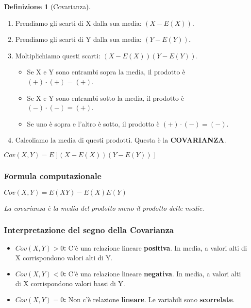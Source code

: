 \documentclass[a4paper, 11pt]{article}
\theoremstyle{definition}
\newtheorem{definizione}{Definizione}[section]
\begin{document}
\begin{definizione}[Covarianza]
\begin{enumerate}
    \item Prendiamo gli scarti di X dalla sua media: $(X - E(X))$.
    \item Prendiamo gli scarti di Y dalla sua media: $(Y - E(Y))$.
    \item Moltiplichiamo questi scarti: $(X - E(X))(Y - E(Y))$.
    \begin{itemize}
        \item Se X e Y sono entrambi sopra la media, il prodotto è $(+) \cdot (+) = (+)$.
        \item Se X e Y sono entrambi sotto la media, il prodotto è $(-) \cdot (-) = (+)$.
        \item Se uno è sopra e l'altro è sotto, il prodotto è $(+) \cdot (-) = (-)$.
    \end{itemize}
    \item Calcoliamo la media di questi prodotti. Questa è la \textbf{COVARIANZA}.
\end{enumerate}
\begin{formulabox}
    $Cov(X,Y) = E[(X-E(X))(Y-E(Y))]$
\end{formulabox}
\end{definizione}

\subsubsection*{Formula computazionale}
\begin{formulabox}
    $Cov(X,Y) = E(XY) - E(X)E(Y)$
\end{formulabox}
\textit{La covarianza è la media del prodotto meno il prodotto delle medie.}

\subsubsection*{Interpretazione del segno della Covarianza}
\begin{itemize}
    \item \textbf{$Cov(X,Y) > 0$:} C'è una relazione lineare \textbf{positiva}. In media, a valori alti di X corrispondono valori alti di Y.
    \item \textbf{$Cov(X,Y) < 0$:} C'è una relazione lineare \textbf{negativa}. In media, a valori alti di X corrispondono valori bassi di Y.
    \item \textbf{$Cov(X,Y) = 0$:} Non c'è relazione \textbf{lineare}. Le variabili sono \textbf{scorrelate}.
\end{itemize}
\end{document}
